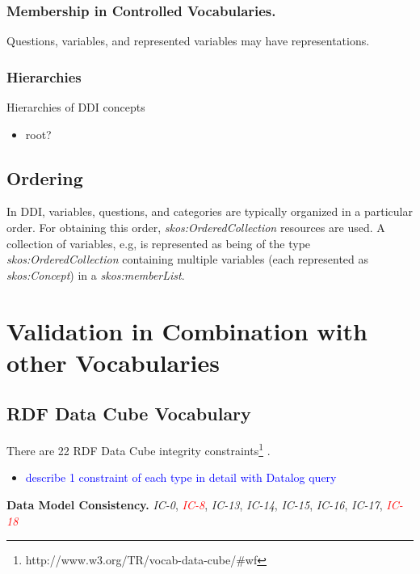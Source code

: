 \documentclass{elsart3p}    %
\begin{document}
\subsubsection{Membership in Controlled Vocabularies.}

Questions, variables, and represented variables may have representations.

\subsubsection{Hierarchies}

Hierarchies of DDI concepts

\begin{itemize}
	\item root?
\end{itemize}

\subsection{Ordering}

In DDI, variables, questions, and categories are typically organized in a particular order. 
For obtaining this order, {\em skos:OrderedCollection} resources are used. 
A collection of variables, e.g, is represented as being of the type {\em skos:OrderedCollection} containing multiple variables (each represented as {\em skos:Concept}) in a {\em skos:memberList}. 

\section{Validation in Combination with other Vocabularies}

\subsection{RDF Data Cube Vocabulary}

There are 22 RDF Data Cube integrity constraints\footnote{http://www.w3.org/TR/vocab-data-cube/\#wf} \cite{CyganiakReynolds2014}.

\begin{itemize}
	\item \textcolor{blue}{describe 1 constraint of each type in detail with Datalog query}
\end{itemize}

\textbf{Data Model Consistency.}
{\em IC-0}, \textcolor{red}{{\em IC-8}}, {\em IC-13}, {\em IC-14}, {\em IC-15}, {\em IC-16}, {\em IC-17}, \textcolor{red}{{\em IC-18}}
\end{document}
